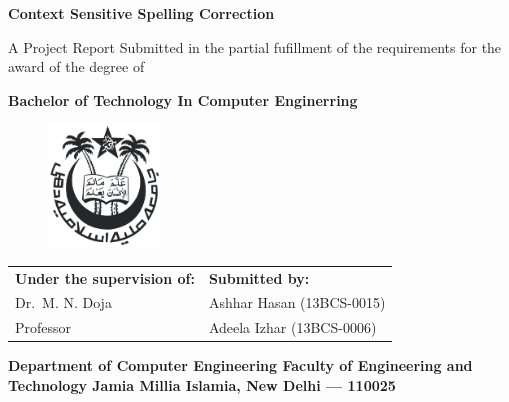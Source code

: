 \begin{titlepage}
    \begin{center}
        \begin{titlefontsize}
            \textbf{Context Sensitive Spelling Correction}\\[\baselineskip]
        \end{titlefontsize}
        \begin{headingfontsize}
            A Project Report\linebreak
            Submitted in the partial fufillment of the requirements for the award of the degree of\\[\baselineskip]
        \end{headingfontsize}
        \begin{titlefontsize}
            \textbf{%
                Bachelor of Technology\linebreak
                In\linebreak
                Computer Enginerring
            }
        \end{titlefontsize}

        \vspace{20mm}
        \begin{figure}[H]
            \centering
            \includegraphics[width=30mm]{img/jmi.png}
        \end{figure}
        \vspace{20mm}

        \begin{headingfontsize}
            \begin{center}
                \begin{tabularx}{\textwidth}{L R}
                    \textbf{Under the supervision of:} & \textbf{Submitted by:}\\
                    Dr.\ M. N. Doja                    & Ashhar Hasan (13BCS-0015)\\
                    Professor                          & Adeela Izhar (13BCS-0006)
                \end{tabularx}
            \end{center}

            \vfill

            \textbf{%
                Department of Computer Engineering\linebreak
                Faculty of Engineering and Technology\linebreak
                Jamia Millia Islamia, New Delhi --- 110025
            }
        \end{headingfontsize}
    \end{center}
\end{titlepage}

